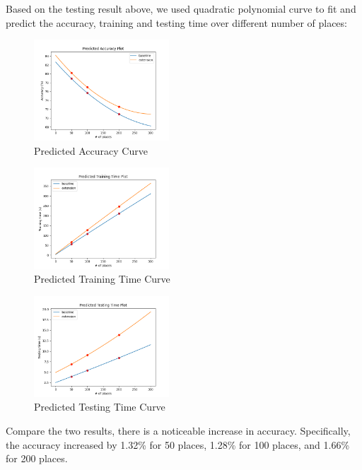 \documentclass[conference]{IEEEtran}
\begin{document}
Based on the testing result above, we used quadratic polynomial curve to fit and predict the accuracy, training and testing time over different number of places:

\begin{figure}[H]
    \centering
    \includegraphics[width=0.45\textwidth]{fig_5.png}
    \caption{Predicted Accuracy Curve}
    \label{fig:5}
\end{figure}

\begin{figure}[H]
    \centering
    \includegraphics[width=0.45\textwidth]{fig_6.png}
    \caption{Predicted Training Time Curve}
    \label{fig:6}
\end{figure}

\begin{figure}[H]
    \centering
    \includegraphics[width=0.45\textwidth]{fig_7.png}
    \caption{Predicted Testing Time Curve}
    \label{fig:7}
\end{figure}

Compare the two results, there is a noticeable increase in accuracy. Specifically, the accuracy increased by 1.32\% for 50 places, 1.28\% for 100 places, and 1.66\% for 200 places.
\end{document}
